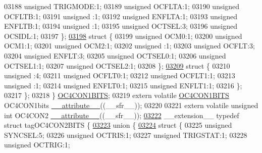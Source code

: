 \begin{DoxyCode}
03188       \textcolor{keywordtype}{unsigned} TRIGMODE:1;
03189       \textcolor{keywordtype}{unsigned} OCFLTA:1;
03190       \textcolor{keywordtype}{unsigned} OCFLTB:1;
03191       \textcolor{keywordtype}{unsigned} :1;
03192       \textcolor{keywordtype}{unsigned} ENFLTA:1;
03193       \textcolor{keywordtype}{unsigned} ENFLTB:1;
03194       \textcolor{keywordtype}{unsigned} :1;
03195       \textcolor{keywordtype}{unsigned} OCTSEL:3;
03196       \textcolor{keywordtype}{unsigned} OCSIDL:1;
03197     \};
\hypertarget{a00015_source_l03198}{}\hyperlink{a00015}{03198}     \textcolor{keyword}{struct }\{
03199       \textcolor{keywordtype}{unsigned} OCM0:1;
03200       \textcolor{keywordtype}{unsigned} OCM1:1;
03201       \textcolor{keywordtype}{unsigned} OCM2:1;
03202       \textcolor{keywordtype}{unsigned} :1;
03203       \textcolor{keywordtype}{unsigned} OCFLT:3;
03204       \textcolor{keywordtype}{unsigned} ENFLT:3;
03205       \textcolor{keywordtype}{unsigned} OCTSEL0:1;
03206       \textcolor{keywordtype}{unsigned} OCTSEL1:1;
03207       \textcolor{keywordtype}{unsigned} OCTSEL2:1;
03208     \};
\hypertarget{a00015_source_l03209}{}\hyperlink{a00015}{03209}     \textcolor{keyword}{struct }\{
03210       \textcolor{keywordtype}{unsigned} :4;
03211       \textcolor{keywordtype}{unsigned} OCFLT0:1;
03212       \textcolor{keywordtype}{unsigned} OCFLT1:1;
03213       \textcolor{keywordtype}{unsigned} :1;
03214       \textcolor{keywordtype}{unsigned} ENFLT0:1;
03215       \textcolor{keywordtype}{unsigned} ENFLT1:1;
03216     \};
03217   \};
03218 \} \hyperlink{a00014_dc/d66/a00630}{OC4CON1BITS};
03219 \textcolor{keyword}{extern} \textcolor{keyword}{volatile} \hyperlink{a00014_dc/d66/a00630}{OC4CON1BITS} OC4CON1bits \hyperlink{a00015_a493c46f03454991ccc5aa7a6e1dfb2a7}{\_\_attribute\_\_}((\_\_sfr\_\_));
03220 
03221 \textcolor{keyword}{extern} \textcolor{keyword}{volatile} \textcolor{keywordtype}{unsigned} \textcolor{keywordtype}{int}  OC4CON2 \hyperlink{a00015_a493c46f03454991ccc5aa7a6e1dfb2a7}{\_\_attribute\_\_}((\_\_sfr\_\_));
\hypertarget{a00015_source_l03222}{}\hyperlink{a00014}{03222} \_\_extension\_\_ \textcolor{keyword}{typedef} \textcolor{keyword}{struct }tagOC4CON2BITS \{
\hypertarget{a00015_source_l03223}{}\hyperlink{a00015}{03223}   \textcolor{keyword}{union }\{
\hypertarget{a00015_source_l03224}{}\hyperlink{a00015}{03224}     \textcolor{keyword}{struct }\{
03225       \textcolor{keywordtype}{unsigned} SYNCSEL:5;
03226       \textcolor{keywordtype}{unsigned} OCTRIS:1;
03227       \textcolor{keywordtype}{unsigned} TRIGSTAT:1;
03228       \textcolor{keywordtype}{unsigned} OCTRIG:1;

\end{DoxyCode}
